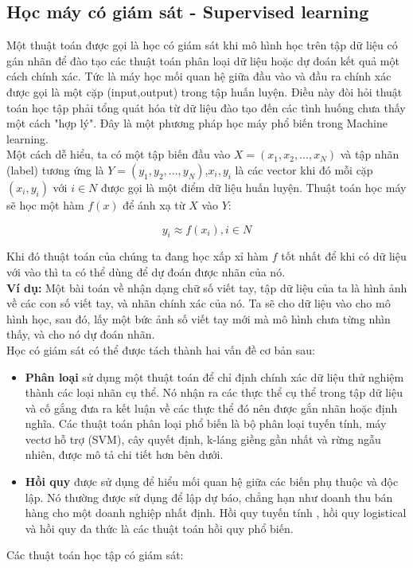 \subsection{Học máy có giám sát - Supervised learning}
Một thuật toán được gọi là học có giám sát khi mô hình học trên tập dữ liệu có gán nhãn để đào tạo các thuật toán phân loại dữ liệu hoặc dự đoán kết quả một cách chính xác. Tức là máy học mối quan hệ giữa đầu vào và đầu ra chính xác được gọi là một cặp (input,output) trong tập huấn luyện. Điều này đòi hỏi thuật toán học tập phải tổng quát hóa từ dữ liệu đào tạo đến các tình huống chưa thấy một cách "hợp lý". Đây là một phương pháp học máy phổ biến trong Machine learning.\\
Một cách dễ hiểu, ta có một tập biến đầu vào $X = (x_1,x_2,...,x_N)$ và tập nhãn (label) tương ứng là $Y = (y_1,y_2,...,y_N)$,$x_i,y_i$ là các vector khi đó mỗi cặp $(x_i,y_i) $ với $i\in N$ được gọi là một điểm dữ liệu huấn luyện. Thuật toán học máy sẽ học một hàm $f(x)$ để ánh xạ từ $X$ vào $Y$:
\begin{center}
\begin{equation*}
    {y_i} \approx f({x_i}),i \in N
\end{equation*}
\end{center}
Khi đó thuật toán của chúng ta đang học xấp xỉ hàm $f$ tốt nhất để khi có dữ liệu với vào thì ta có thể dùng để dự đoán được nhãn của nó.\\
\textbf{Ví dụ:} Một bài toán về nhận dạng chữ số viết tay, tập dữ liệu của ta là hình ảnh về các con số viết tay, và nhãn chính xác của nó. Ta sẽ cho dữ liệu vào cho mô hình học, sau đó, lấy một bức ảnh số viết tay mới mà mô hình chưa từng nhìn thấy, và cho nó dự đoán nhãn.\\
Học có giám sát có thể được tách thành hai vấn đề cơ bản sau:
\begin{itemize}
    \item \textbf{Phân loại} sử dụng một thuật toán để chỉ định chính xác dữ liệu thử nghiệm thành các loại nhãn cụ thể. Nó nhận ra các thực thể cụ thể trong tập dữ liệu và cố gắng đưa ra kết luận về các thực thể đó nên được gắn nhãn hoặc định nghĩa. Các thuật toán phân loại phổ biến là bộ phân loại tuyến tính, máy vectơ hỗ trợ (SVM), cây quyết định, k-láng giềng gần nhất và rừng ngẫu nhiên, được mô tả chi tiết hơn bên dưới.
    \item \textbf{Hồi quy} được sử dụng để hiểu mối quan hệ giữa các biến phụ thuộc và độc lập. Nó thường được sử dụng để lập dự báo, chẳng hạn như doanh thu bán hàng cho một doanh nghiệp nhất định. Hồi quy tuyến tính , hồi quy logistical và hồi quy đa thức là các thuật toán hồi quy phổ biến.
\end{itemize}
Các thuật toán học tập có giám sát:
